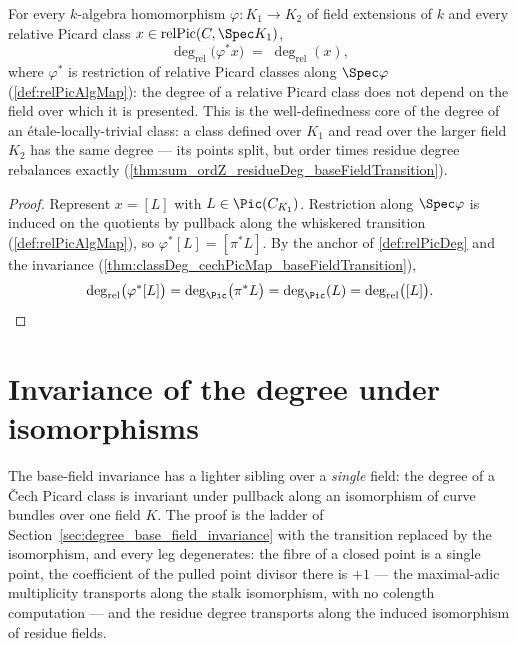 \begin{theorem}
  \label{thm:relPicDeg_relPicAlgMap}
  \leanok
  For every \(k\)-algebra homomorphism \(\varphi : K_1 \to K_2\) of field extensions
  of \(k\) and every relative Picard class \(x \in \mathrm{relPic}(C, \Spec K_1)\),
  \[
    \deg_{\mathrm{rel}}\bigl(\varphi^{*}x\bigr) \;=\; \deg_{\mathrm{rel}}(x),
  \]
  where \(\varphi^{*}\) is restriction of relative Picard classes along
  \(\Spec\varphi\) (\ref{def:relPicAlgMap}): the degree of a relative Picard class
  does not depend on the field over which it is presented. This is the
  well-definedness core of the degree of an \'etale-locally-trivial class: a class
  defined over \(K_1\) and read over the larger field \(K_2\) has the same degree ---
  its points split, but order times residue degree rebalances exactly
  (\ref{thm:sum_ordZ_residueDeg_baseFieldTransition}).
\end{theorem}
\begin{proof}
  \leanok
  Represent \(x = [L]\) with \(L \in \Pic(C_{K_1})\). Restriction along
  \(\Spec\varphi\) is induced on the quotients by pullback along the whiskered
  transition (\ref{def:relPicAlgMap}), so \(\varphi^{*}[L] = [\pi^{*}L]\). By the
  anchor of \ref{def:relPicDeg} and the invariance
  (\ref{thm:classDeg_cechPicMap_baseFieldTransition}),
  \[
    \deg_{\mathrm{rel}}\bigl(\varphi^{*}[L]\bigr)
      = \deg_{\Pic}\bigl(\pi^{*}L\bigr)
      = \deg_{\Pic}(L)
      = \deg_{\mathrm{rel}}\bigl([L]\bigr). \qedhere
  \]
\end{proof}

\section{Invariance of the degree under isomorphisms}
\label{sec:degree_iso_invariance}

The base-field invariance has a lighter sibling over a \emph{single} field: the degree
of a \v Cech Picard class is invariant under pullback along an isomorphism of curve
bundles over one field \(K\). The proof is the ladder of
Section~\ref{sec:degree_base_field_invariance} with the transition replaced by the
isomorphism, and every leg degenerates: the fibre of a closed point is a single point,
the coefficient of the pulled point divisor there is \(+1\) --- the maximal-adic
multiplicity transports along the stalk isomorphism, with no colength computation ---
and the residue degree transports along the induced isomorphism of residue fields.

